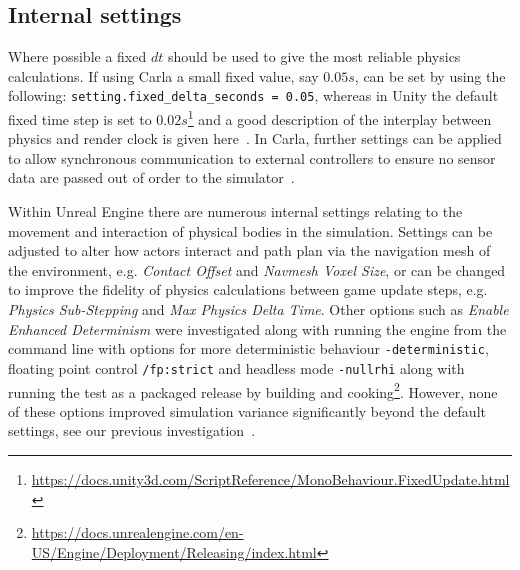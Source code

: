 \documentclass[letterpaper, 10 pt, journal, twoside]{IEEEtran}
\begin{document}
\subsection{Internal settings}
Where possible a fixed $dt$ should be used to give the most reliable physics calculations. If using Carla a small fixed value, say $0.05s$, can be set by using the following: \texttt{setting.fixed\_delta\_seconds = 0.05}, whereas in Unity the default fixed time step is set to $0.02s$\footnote{\url{https://docs.unity3d.com/ScriptReference/MonoBehaviour.FixedUpdate.html}} and a good description of the interplay between physics and render clock is given here~\cite{JohnAustinUnity}. In Carla, further settings can be applied to allow synchronous communication to external controllers to ensure no sensor data are passed out of order to the simulator~\cite{carla_sim_config}.

Within Unreal Engine there are numerous internal settings relating to the movement and interaction of physical bodies in the simulation. Settings can be adjusted to alter how actors interact and path plan via the navigation mesh of the environment, e.g. \textit{Contact Offset} and \textit{Navmesh Voxel Size}, or can be changed to improve the fidelity of physics calculations between game update steps, e.g. \textit{Physics Sub-Stepping} and \textit{Max Physics Delta Time}. Other options such as \textit{Enable Enhanced Determinism} were investigated along with running the engine from the command line with options for more deterministic behaviour \texttt{-deterministic}, floating point control \texttt{/fp:strict} and headless mode \texttt{-nullrhi} along with running the test as a packaged release by building and cooking\footnote{\url{https://docs.unrealengine.com/en-US/Engine/Deployment/Releasing/index.html}}. However, none of these options improved simulation variance significantly beyond the default settings, see our previous investigation~\cite{TSLUnrealEngineTesting}.

\end{document}

